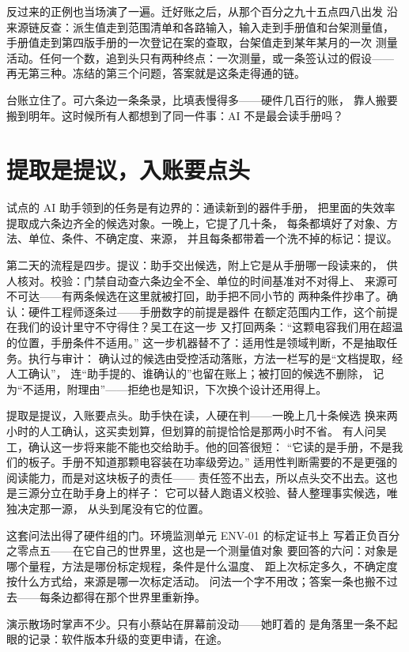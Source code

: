反过来的正例也当场演了一遍。迁好账之后，从那个百分之九十五点四八出发
沿来源链反查：派生值走到范围清单和各路输入，输入走到手册值和台架测量值，
手册值走到第四版手册的一次登记在案的查取，台架值走到某年某月的一次
测量活动。任何一个数，追到头只有两种终点：一次测量，或一条签认过的假设——
再无第三种。冻结的第三个问题，答案就是这条走得通的链。

台账立住了。可六条边一条条录，比填表慢得多——硬件几百行的账，
靠人搬要搬到明年。这时候所有人都想到了同一件事：AI 不是最会读手册吗？

\section{提取是提议，入账要点头}

试点的 AI 助手领到的任务是有边界的：通读新到的器件手册，
把里面的失效率提取成六条边齐全的候选对象。一晚上，它提了几十条，
每条都填好了对象、方法、单位、条件、不确定度、来源，
并且每条都带着一个洗不掉的标记：提议。

第二天的流程是四步。提议：助手交出候选，附上它是从手册哪一段读来的，
供人核对。校验：门禁自动查六条边全不全、单位的时间基准对不对得上、
来源可不可达——有两条候选在这里就被打回，助手把不同小节的
两种条件抄串了。确认：硬件工程师逐条过——手册数字的前提是器件
在额定范围内工作，这个前提在我们的设计里守不守得住？吴工在这一步
又打回两条：“这颗电容我们用在超温的位置，手册条件不适用。”
这一步机器替不了：适用性是领域判断，不是抽取任务。执行与审计：
确认过的候选由受控活动落账，方法一栏写的是“文档提取，经人工确认”，
连“助手提的、谁确认的”也留在账上；被打回的候选不删除，
记为“不适用，附理由”——拒绝也是知识，下次换个设计还用得上。

提取是提议，入账要点头。助手快在读，人硬在判——一晚上几十条候选
换来两小时的人工确认，这买卖划算，但划算的前提恰恰是那两小时不省。
有人问吴工，确认这一步将来能不能也交给助手。他的回答很短：
“它读的是手册，不是我们的板子。手册不知道那颗电容装在功率级旁边。”
适用性判断需要的不是更强的阅读能力，而是对这块板子的责任——
责任签不出去，所以点头交不出去。这也是三源分立在助手身上的样子：
它可以替人跑语义校验、替人整理事实候选，唯独决定那一源，
从头到尾没有它的位置。

这套问法出得了硬件组的门。环境监测单元 ENV-01 的标定证书上
写着正负百分之零点五——在它自己的世界里，这也是一个测量值对象
要回答的六问：对象是哪个量程，方法是哪份标定规程，条件是什么温度、
距上次标定多久，不确定度按什么方式给，来源是哪一次标定活动。
问法一个字不用改；答案一条也搬不过去——每条边都得在那个世界里重新挣。

演示散场时掌声不少。只有小蔡站在屏幕前没动——她盯着的
是角落里一条不起眼的记录：软件版本升级的变更申请，在途。

